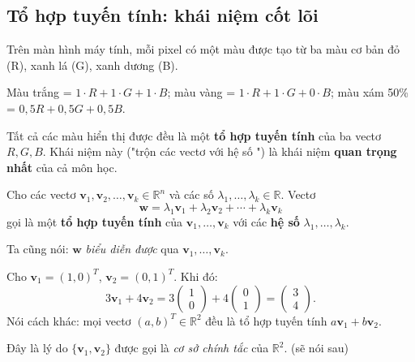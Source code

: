 \documentclass[12pt,a4paper]{article}
\begin{document}
\subsection{Tổ hợp tuyến tính: khái niệm cốt lõi}

\begin{dongco}
Trên màn hình máy tính, mỗi pixel có một màu được tạo từ ba màu cơ bản đỏ (R), xanh lá (G), xanh dương (B).

Màu trắng = $1 \cdot R + 1 \cdot G + 1 \cdot B$; màu vàng = $1 \cdot R + 1 \cdot G + 0 \cdot B$; màu xám 50\% = $0{,}5 R + 0{,}5 G + 0{,}5 B$.

Tất cả các màu hiển thị được đều là một \textbf{tổ hợp tuyến tính} của ba vectơ $R, G, B$. Khái niệm này ("trộn các vectơ với hệ số ") là khái niệm \textbf{quan trọng nhất} của cả môn học.
\end{dongco}

\begin{dinhnghia}
  Cho các vectơ $\mathbf{v}_1, \mathbf{v}_2, \ldots, \mathbf{v}_k \in \mathbb{R}^n$ và các số $\lambda_1, \ldots, \lambda_k \in \mathbb{R}$. Vectơ
  \[
    \mathbf{w} = \lambda_1 \mathbf{v}_1 + \lambda_2 \mathbf{v}_2 + \cdots + \lambda_k \mathbf{v}_k
  \]
  gọi là một \textbf{tổ hợp tuyến tính} của $\mathbf{v}_1, \ldots, \mathbf{v}_k$ với các \textbf{hệ số} $\lambda_1, \ldots, \lambda_k$.

  Ta cũng nói: $\mathbf{w}$ \emph{biểu diễn được} qua $\mathbf{v}_1, \ldots, \mathbf{v}_k$.
\end{dinhnghia}

\begin{vidu}[title={Trộn hai vectơ}]
Cho $\mathbf{v}_1 = (1,0)^T$, $\mathbf{v}_2 = (0,1)^T$. Khi đó:
\[
  3\mathbf{v}_1 + 4\mathbf{v}_2 = 3\begin{pmatrix}1\\0\end{pmatrix} + 4\begin{pmatrix}0\\1\end{pmatrix} = \begin{pmatrix}3\\4\end{pmatrix}.
\]
Nói cách khác: mọi vectơ $(a, b)^T \in \mathbb{R}^2$ đều là tổ hợp tuyến tính $a\mathbf{v}_1 + b\mathbf{v}_2$.

Đây là lý do $\{\mathbf{v}_1, \mathbf{v}_2\}$ được gọi là \emph{cơ sở chính tắc} của $\mathbb{R}^2$. (sẽ nói sau)
\end{vidu}
\end{document}
